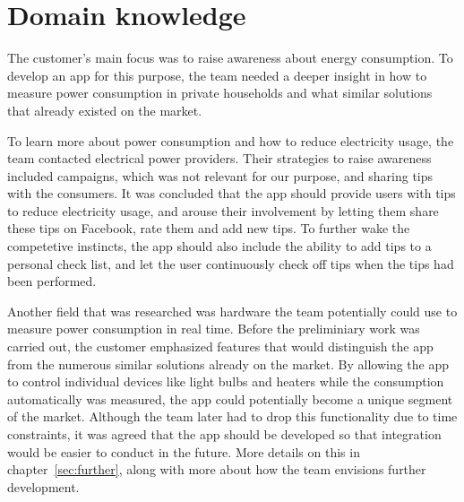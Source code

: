 \section{Domain knowledge}
The customer's main focus was to raise awareness about energy consumption. To develop an app for this purpose, the team needed a deeper insight in how to measure power consumption in private households and what similar solutions that already existed on the market.

To learn more about power consumption and how to reduce electricity usage, the team contacted electrical power providers. Their strategies to raise awareness included campaigns, which was not relevant for our purpose, and sharing tips with the consumers. It was concluded that the app should provide users with tips to reduce electricity usage, and arouse their involvement by letting them share these tips on Facebook, rate them and add new tips. To further wake the competetive instincts, the app should also include the ability to add tips to a personal check list, and let the user continuously check off tips when the tips had been performed.

Another field that was researched was hardware the team potentially could use to measure power consumption in real time. Before the preliminiary work was carried out, the customer emphasized features that would distinguish the app from the numerous similar solutions already on the market. By allowing the app to control individual devices like light bulbs and heaters while the consumption automatically was measured, the app could potentially become a unique segment of the market. Although the team later had to drop this functionality due to time constraints, it was agreed that the app should be developed so that integration would be easier to conduct in the future. More details on this in chapter~\ref{sec:further}, along with more about how the team envisions further development.

